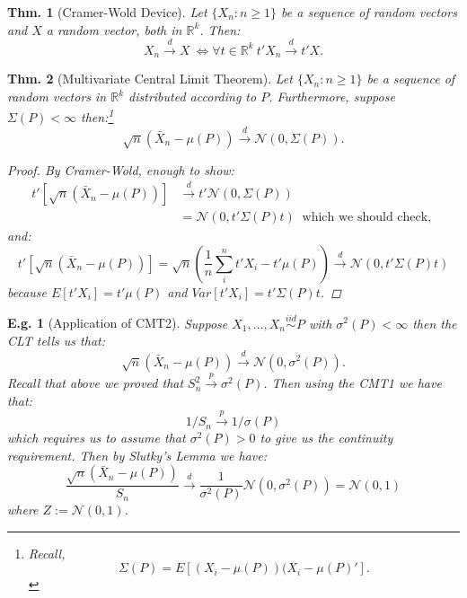 \documentclass{tufte-book}
\theoremstyle{mytheoremstyle}
\newtheorem*{thm}{Thm.}
\theoremstyle{mylemstyle}
\theoremstyle{mydefstyle}
\newtheorem*{ex}{E.g.}
\begin{document}
\begin{thm}[Cramer-Wold Device] Let \(\{X_n: n \ge 1\}\) be a sequence of random vectors and \(X\) a random vector, both in \(\mathbb{R}^k\). Then:
	\[X_n \overset{d}{\rightarrow} X\ \iff \forall t \in \mathbb{R}^k\ t'X_n \overset{d}{\rightarrow} t'X \text{.}\]
\end{thm}

\begin{thm}[Multivariate Central Limit Theorem] Let \(\{X_n: n \ge 1\}\) be a sequence of random vectors in \(\mathbb{R}^k\) distributed according to \(P\). Furthermore, suppose \(\Sigma(P) < \infty\) then:\footnote{Recall, \[\Sigma(P) = E[(X_i - \mu(P))(X_i - \mu(P)'] \text{.}\]}
	\[\sqrt{n}(\bar{X}_n - \mu(P)) \overset{d}{\rightarrow} \mathcal{N}(0, \Sigma(P)) \text{.}\]
	\begin{proof}
		By Cramer-Wold, enough to show:
		\begin{align*}
			t'[\sqrt{n}(\bar{X}_n - \mu(P))] & \overset{d}{\rightarrow} t' \mathcal{N}(0, \Sigma(P)) \\
									& = \mathcal{N}\left(0, t'\Sigma(P)t\right)\ \text{ which we should check, }
		\end{align*}
		and: 
			\[t'[\sqrt{n}(\bar{X}_n - \mu(P))] = \sqrt{n}\left(\frac{1}{n} \sum_i^n t'X_i - t' \mu(P)\right) \overset{d}{\rightarrow}  \mathcal{N}\left(0, t'\Sigma(P)t\right)\]
		because \(E[t'X_i] = t'\mu(P)\) and \(Var[t'X_i] = t'\Sigma(P)t\). 
	\end{proof}
\end{thm}

\begin{ex}[Application of CMT2] Suppose \(X_1, \dots, X_n \overset{iid}{\sim} P\) with \(\sigma^2(P) < \infty\) then the CLT tells us that:
	\[\sqrt{n}(\bar{X}_n - \mu(P)) \overset{d}{\rightarrow} \mathcal{N}(0, \sigma^2(P)) \text{.}\]
Recall that above we proved that \(S_n^2 \overset{p}{\rightarrow} \sigma^2(P)\). Then using the CMT1 we have that:
	\[1/S_n \overset{p}{\rightarrow} 1/\sigma(P)\]
which requires us to assume that \(\sigma^2(P) > 0\) to give us the continuity requirement. Then by Slutky's Lemma we have:
	\[\frac{\sqrt{n}(\bar{X}_n - \mu(P))}{S_n} \overset{d}{\rightarrow} \frac{1}{\sigma^2(P)} \mathcal{N}(0, \sigma^2(P)) = \mathcal{N}(0, 1)\]
where \(Z := \mathcal{N}(0, 1)\). 
\end{ex}
\end{document}

